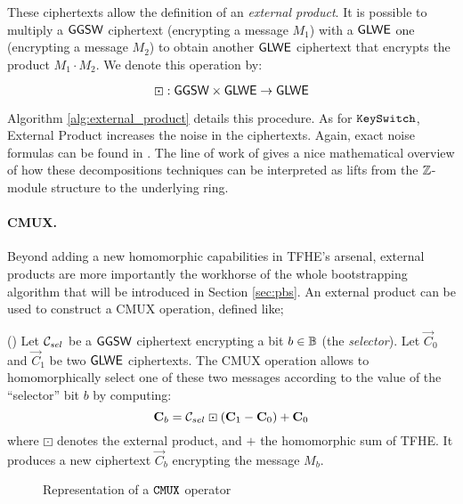 These ciphertexts allow the definition of an \textit{external product}. It is possible to multiply a $\textsf{GGSW}$ ciphertext (encrypting a message $M_1$) with a $\textsf{GLWE}$ one (encrypting a message $M_2$) to obtain another $\textsf{GLWE}$ ciphertext that encrypts the product $M_1 \cdot M_2$. We denote this operation by:

\begin{equation*}
		\boxdot: \textsf{GGSW} \times \textsf{GLWE} \rightarrow \textsf{GLWE}
\end{equation*}


Algorithm \ref{alg:external_product} details this procedure. As for $\texttt{KeySwitch}$, External Product increases the noise in the ciphertexts. Again, exact noise formulas can be found in \cite{JC:CGGI20, these_tap}. The line of work of \cite{chimera, AC:BCGGJ24} gives a nice mathematical overview of how these decompositions techniques can be interpreted as lifts from the $\mathbb{Z}$-module structure to the underlying ring. 






\paragraph{CMUX.}

Beyond adding a new homomorphic capabilities in TFHE's arsenal, external products are more importantly the workhorse of the whole bootstrapping algorithm that will be introduced in Section \ref{sec:pbs}. An external product can be used to construct a CMUX operation, defined like;

\begin{definition}(\CMUX)
	\label{def:cmux}
	Let $\mathcal C_{sel}$ be a $\textsf{GGSW}$ ciphertext encrypting a bit $b \in \mathbb{B}$ (the \textit{selector}). Let $\vec C_0$ and $\vec C_1$ be two $\textsf{GLWE}$ ciphertexts. The CMUX operation allows to homomorphically select one of these two messages according to the value of the ``selector'' bit $b$ by computing:
	\begin{equation*}
		\mathbf C_b = \mathcal C_{sel} \boxdot (\mathbf C_1 - \mathbf C_0) + \mathbf C_0
	\end{equation*}
	where $\boxdot$ denotes the external product, and $+$ the homomorphic sum of TFHE. It produces a new ciphertext $\vec C_b$ encrypting the message $M_b$.
\end{definition}


\begin{figure}
	\centering
	\singleCmux
	\caption{Representation of a $\texttt{CMUX}$ operator}
	\label{fig:cmux}
\end{figure}


